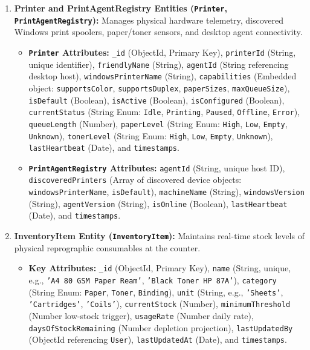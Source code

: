 \documentclass[12pt,a4paper]{report}
\begin{document}
\begin{enumerate}[leftmargin=0.35in, itemsep=4pt]
  \item \textbf{Printer and PrintAgentRegistry Entities (\texttt{Printer}, \texttt{PrintAgentRegistry}):}
  Manages physical hardware telemetry, discovered Windows print spoolers, paper/toner sensors, and desktop agent connectivity.
  \begin{itemize}[leftmargin=0.25in, itemsep=2pt]
    \item \textbf{\texttt{Printer} Attributes:} \texttt{\_id} (ObjectId, Primary Key), \texttt{printerId} (String, unique identifier), \texttt{friendlyName} (String), \texttt{agentId} (String referencing desktop host), \texttt{windowsPrinterName} (String), \texttt{capabilities} (Embedded object: \texttt{supportsColor}, \texttt{supportsDuplex}, \texttt{paperSizes}, \texttt{maxQueueSize}), \texttt{isDefault} (Boolean), \texttt{isActive} (Boolean), \texttt{isConfigured} (Boolean), \texttt{currentStatus} (String Enum: \texttt{Idle}, \texttt{Printing}, \texttt{Paused}, \texttt{Offline}, \texttt{Error}), \texttt{queueLength} (Number), \texttt{paperLevel} (String Enum: \texttt{High}, \texttt{Low}, \texttt{Empty}, \texttt{Unknown}), \texttt{tonerLevel} (String Enum: \texttt{High}, \texttt{Low}, \texttt{Empty}, \texttt{Unknown}), \texttt{lastHeartbeat} (Date), and \texttt{timestamps}.
    \item \textbf{\texttt{PrintAgentRegistry} Attributes:} \texttt{agentId} (String, unique host ID), \texttt{discoveredPrinters} (Array of discovered device objects: \texttt{windowsPrinterName}, \texttt{isDefault}), \texttt{machineName} (String), \texttt{windowsVersion} (String), \texttt{agentVersion} (String), \texttt{isOnline} (Boolean), \texttt{lastHeartbeat} (Date), and \texttt{timestamps}.
  \end{itemize}

  \item \textbf{InventoryItem Entity (\texttt{InventoryItem}):}
  Maintains real-time stock levels of physical reprographic consumables at the counter.
  \begin{itemize}[leftmargin=0.25in, itemsep=2pt]
    \item \textbf{Key Attributes:} \texttt{\_id} (ObjectId, Primary Key), \texttt{name} (String, unique, e.g., \texttt{'A4 80 GSM Paper Ream'}, \texttt{'Black Toner HP 87A'}), \texttt{category} (String Enum: \texttt{Paper}, \texttt{Toner}, \texttt{Binding}), \texttt{unit} (String, e.g., \texttt{'Sheets'}, \texttt{'Cartridges'}, \texttt{'Coils'}), \texttt{currentStock} (Number), \texttt{minimumThreshold} (Number low-stock trigger), \texttt{usageRate} (Number daily rate), \texttt{daysOfStockRemaining} (Number depletion projection), \texttt{lastUpdatedBy} (ObjectId referencing \texttt{User}), \texttt{lastUpdatedAt} (Date), and \texttt{timestamps}.
  \end{itemize}


\end{enumerate}
\end{document}
